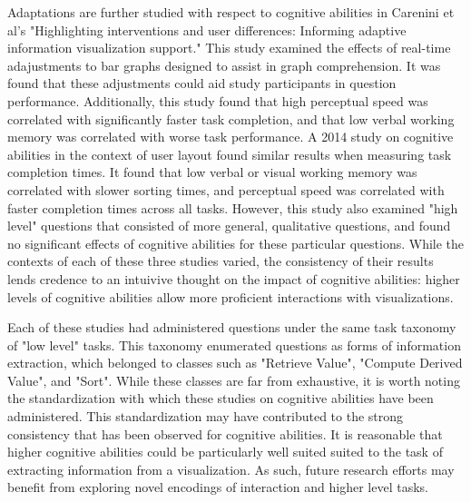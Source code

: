 \documentclass[conference]{IEEEtran}
\begin{document}
Adaptations are further studied with respect to cognitive abilities in
Carenini et al's "Highlighting interventions and user differences:
Informing adaptive information visualization support." This study
examined the effects of real-time adajustments to bar graphs designed to
assist in graph comprehension. It was found that these adjustments could
aid study participants in question performance. Additionally, this study
found that high perceptual speed was correlated with significantly faster
task completion, and that low verbal working memory was correlated with
worse task performance\cite{HighlightingInterventions}. A 2014 study on
cognitive abilities in the context of user layout found similar
results when measuring task completion times. It found that low verbal or visual
working memory was correlated with slower sorting times, and perceptual speed
was correlated with faster completion times across all tasks\cite{ConatiLayouts}.
However, this study also examined "high level" questions that consisted of more
general, qualitative questions, and found no significant effects of cognitive
abilities for these particular questions.
While the contexts of each of these three studies varied, the consistency of their
results lends credence to an intuivive thought on the impact of cognitive abilities:
higher levels of cognitive abilities allow more proficient interactions with visualizations.

Each of these studies had administered questions under the same task taxonomy of
"low level" tasks. This taxonomy enumerated questions as forms of information
extraction, which belonged to classes such as "Retrieve Value", "Compute Derived
Value", and "Sort"\cite{Amar}. While these classes are far from exhaustive, it is
worth noting the standardization with which these studies on cognitive abilities
have been administered. This standardization may have contributed to the strong 
consistency that has been observed for cognitive abilities. It is reasonable that
higher cognitive abilities could be particularly well suited suited to the task
of extracting information from a visualization. As such, future research efforts
may benefit from exploring novel encodings of interaction and higher level tasks.


\end{document}
